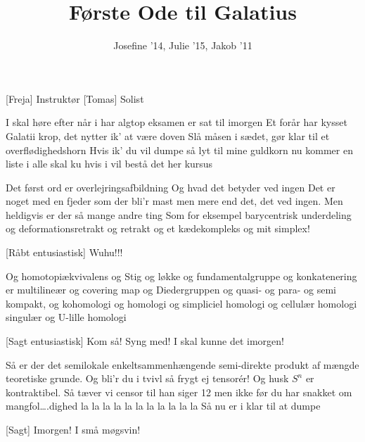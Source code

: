 \documentclass[a4paper,11pt]{article}
\title{Første Ode til Galatius}
\author{Josefine '14, Julie '15, Jakob '11}
\begin{document}
\maketitle

\begin{roles}
[Freja] Instruktør
[Tomas] Solist


\end{roles}

\begin{song}

 I skal høre efter når i har algtop
eksamen er sat til imorgen
Et forår har kysset Galatii krop,
det nytter ik’ at være doven
Slå måsen i sædet, gør klar til et overflødighedshorn
Hvis ik’ du vil dumpe så lyt til mine guldkorn 
nu kommer en liste i alle skal ku
hvis i vil bestå det her kursus


 Det først ord er overlejringsafbildning
Og hvad det betyder ved ingen 
Det er noget med en fjeder som der bli’r mast 
men mere end det, det ved ingen.
Men heldigvis er der så mange andre ting
Som for eksempel barycentrisk underdeling
og deformationsretrakt og retrakt og
et kædekompleks og mit simplex! 

[Råbt entusiastisk] Wuhu!!!


 Og homotopiækvivalens og Stig
og løkke og fundamentalgruppe
og konkatenering er multilineær
og covering map og Diedergruppen
og quasi- og para- og semi kompakt, 
og kohomologi og homologi og
simpliciel homologi og cellulær homologi
singulær og U-lille homologi

[Sagt entusiastisk] Kom så! Syng med! I skal kunne det imorgen!

 Så er der det semilokale enkeltsammenhængende semi-direkte produkt 
af mængde teoretiske grunde.
Og bli’r du i tvivl så frygt ej tensorér!
Og husk $S^n$ er kontraktibel.
Så tæver vi censor til han siger 12
men ikke før du har snakket om
mangfol….dighed
la la la la la la la la la la la
Så nu er i klar til at dumpe %


[Sagt] Imorgen! I små møgsvin!





\end{song}
\end{document}
